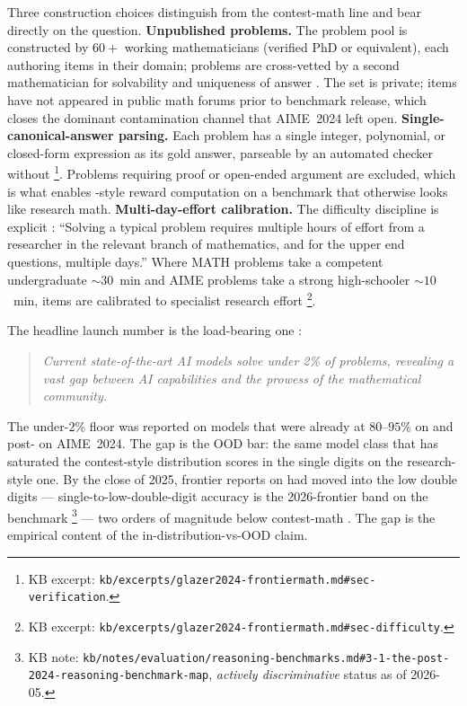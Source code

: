 Three construction choices distinguish  from the
contest-math line and bear directly on the  question.
\textbf{Unpublished problems.} The problem pool is constructed by
$60+$ working mathematicians (verified PhD or equivalent), each
authoring items in their domain; problems are cross-vetted by a
second mathematician for solvability and uniqueness of answer
\citep[\S{}sec-verification]{glazer2024-frontiermath}. The set is
private; items have not appeared in public math forums prior to
benchmark release, which closes the dominant contamination channel
that AIME~2024 left open.
\textbf{Single-canonical-answer parsing.} Each problem has a
single integer, polynomial, or closed-form expression as its gold
answer, parseable by an automated checker without %
\footnote{KB excerpt: \texttt{kb/excerpts/glazer2024-frontiermath.md\#sec-verification}.}.
Problems requiring proof or open-ended argument are excluded, which
is what enables -style reward computation on a benchmark that
otherwise looks like research math.
\textbf{Multi-day-effort calibration.} The difficulty discipline is
explicit \citep[\S{}sec-difficulty]{glazer2024-frontiermath}:
``Solving a typical problem requires multiple hours of effort from a
researcher in the relevant branch of mathematics, and for the upper
end questions, multiple days.'' Where MATH problems take a competent
undergraduate $\sim 30$~min and AIME problems take a strong
high-schooler $\sim 10$~min,  items are calibrated to
specialist research effort%
\footnote{KB excerpt: \texttt{kb/excerpts/glazer2024-frontiermath.md\#sec-difficulty}.}.

The headline launch number is the load-bearing one
\citep[\S{}abstract,\S{}sec-launch-result]{glazer2024-frontiermath}:

\begin{quote}\itshape
Current state-of-the-art AI models solve under 2\% of problems,
revealing a vast gap between AI capabilities and the prowess of the
mathematical community.
\end{quote}

The under-$2\%$ floor was reported on models that were already at
$80$--$95\%$ on  and post- on AIME~2024. The gap is
the OOD bar: the same model class that has saturated the
contest-style distribution scores in the single digits on the
research-style one. By the close of 2025, frontier 
reports on  had moved into the low double digits ---
single-to-low-double-digit accuracy is the 2026-frontier band on the
benchmark%
\footnote{KB note: \texttt{kb/notes/evaluation/reasoning-benchmarks.md\#3-1-the-post-2024-reasoning-benchmark-map}, \emph{actively discriminative} status as of 2026-05.}
--- two orders of magnitude below contest-math . The gap
is the empirical content of the in-distribution-vs-OOD claim.

